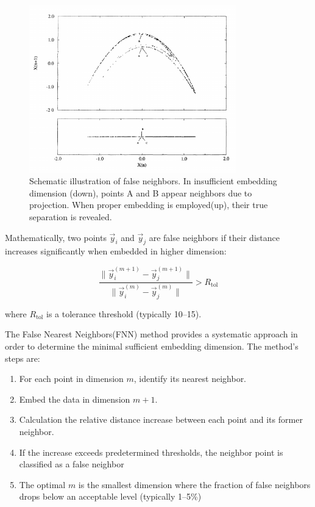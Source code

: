 \documentclass{article}
\begin{document}
			\begin{figure}[h]
			\centering
			\includegraphics[width=0.8\textwidth]{fnn_schematic.png}
			\caption{Schematic illustration of false neighbors. In insufficient embedding dimension (down), points A and B appear neighbors due to projection. When proper embedding is employed(up), their true separation is revealed.}
			\label{fig:fnn_schematic}
			\end{figure}

			Mathematically, two points $\vec{y}_i$ and $\vec{y}_j$ are false neighbors if their distance increases significantly when embedded in higher dimension:

			\begin{equation}
			\frac{\|\vec{y}_i^{(m+1)} - \vec{y}_j^{(m+1)}\|}{\|\vec{y}_i^{(m)} - \vec{y}_j^{(m)}\|} > R_{\text{tol}}
			\end{equation}

			where $R_{\text{tol}}$ is a tolerance threshold (typically 10--15).

			The False Nearest Neighbors(FNN) method \cite{kennel1992} 
			provides a systematic approach in order to determine the 
			minimal sufficient embedding dimension. The method's steps are:

			\begin{enumerate}
			\item For each point in dimension $m$, identify its nearest neighbor.
			\item Embed the data in dimension $m+1$.
			\item Calculation the relative distance increase between each point and its former neighbor.
			\item If the increase exceeds predetermined thresholds, the neighbor point is classified as a false neighbor
			\item The optimal $m$ is the smallest dimension where the fraction of 
				false neighbors drops below an acceptable level (typically 1--5\%)
			\end{enumerate}
\end{document}
